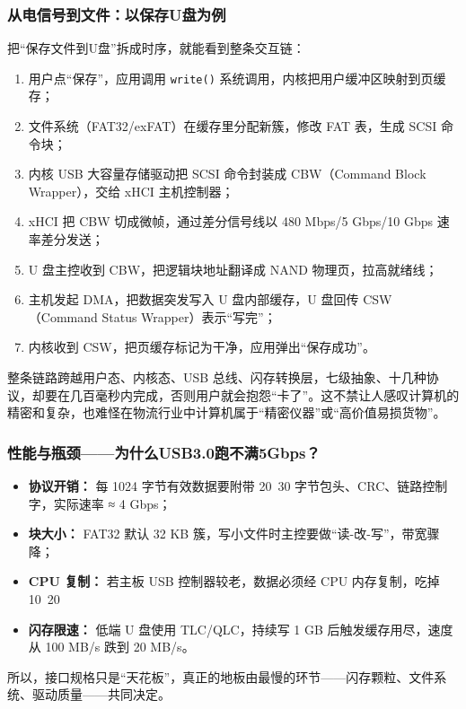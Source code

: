 \subsubsection{从电信号到文件：以保存U盘为例}

把“保存文件到U盘”拆成时序，就能看到整条交互链：
\begin{enumerate}
\item 用户点“保存”，应用调用 \texttt{write()} 系统调用，内核把用户缓冲区映射到页缓存；
\item 文件系统（FAT32/exFAT）在缓存里分配新簇，修改 FAT 表，生成 SCSI 命令块；
\item 内核 USB 大容量存储驱动把 SCSI 命令封装成 CBW（Command Block Wrapper），交给 xHCI 主机控制器；
\item xHCI 把 CBW 切成微帧，通过差分信号线以 480 Mbps/5 Gbps/10 Gbps 速率差分发送；
\item U 盘主控收到 CBW，把逻辑块地址翻译成 NAND 物理页，拉高就绪线；
\item 主机发起 DMA，把数据突发写入 U 盘内部缓存，U 盘回传 CSW（Command Status Wrapper）表示“写完”；
\item 内核收到 CSW，把页缓存标记为干净，应用弹出“保存成功”。
\end{enumerate}
整条链路跨越用户态、内核态、USB 总线、闪存转换层，七级抽象、十几种协议，却要在几百毫秒内完成，否则用户就会抱怨“卡了”。这不禁让人感叹计算机的精密和复杂，也难怪在物流行业中计算机属于“精密仪器”或“高价值易损货物”。

\subsubsection{性能与瓶颈——为什么USB3.0跑不满5Gbps？}
\begin{itemize}
\item \textbf{协议开销：} 每 1024 字节有效数据要附带 20~30 字节包头、CRC、链路控制字，实际速率 ≈ 4 Gbps；
\item \textbf{块大小：} FAT32 默认 32 KB 簇，写小文件时主控要做“读-改-写”，带宽骤降；
\item \textbf{CPU 复制：} 若主板 USB 控制器较老，数据必须经 CPU 内存复制，吃掉 10~20%
\item \textbf{闪存限速：} 低端 U 盘使用 TLC/QLC，持续写 1 GB 后触发缓存用尽，速度从 100 MB/s 跌到 20 MB/s。
\end{itemize}
所以，接口规格只是“天花板”，真正的地板由最慢的环节——闪存颗粒、文件系统、驱动质量——共同决定。

